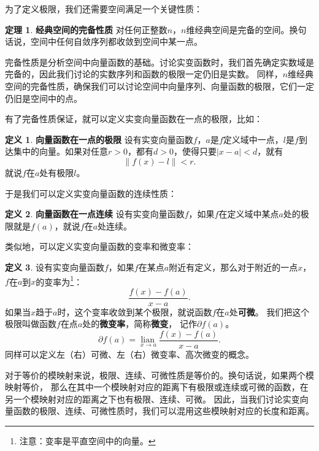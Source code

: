 \documentclass[12pt,UTF8]{ctexbook}
\newcommand{\lian}[1]{
    \underset{#1}{\operatorname{lian}\,}
}
\theoremstyle{definition}
\newtheorem{df}{定义}[section]
\newtheorem{tm}{定理}[section]
\theoremstyle{plain}
\begin{document}
为了定义极限，我们还需要空间满足一个关键性质：
\begin{tm}{\textbf{经典空间的完备性质}}
    对任何正整数$n$，$n$维经典空间是完备的空间。换句话说，空间中任何自敛序列都收敛到空间中某一点。
\end{tm}
完备性质是分析空间中向量函数的基础。讨论实变函数时，我们首先确定实数域是完备的，因此我们讨论的实数序列和函数的极限一定仍旧是实数。
同样，$n$维经典空间的完备性质，确保我们可以讨论空间中向量序列、向量函数的极限，它们一定仍旧是空间中的点。

有了完备性质保证，就可以定义实变向量函数在一点的极限，比如：
\begin{df}{\textbf{向量函数在一点的极限}}
    设有实变向量函数$f$，$a$是$f$定义域中一点，$l$是$f$到达集中的向量。如果对任意$r>0$，都有$d>0$，使得只要$|x - a| < d$，就有
    $$\left\|f(x) - l\right\| < r.$$
    就说$f$在$a$处有极限$l$。
\end{df}

于是我们可以定义实变向量函数的连续性质：
\begin{df}{\textbf{向量函数在一点连续}}
    设有实变向量函数$f$，如果$f$在定义域中某点$a$处的极限就是$f(a)$，就说$f$在$a$处连续。
\end{df}

类似地，可以定义实变向量函数的变率和微变率：
\begin{df}
    设有实变向量函数$f$，如果$f$在某点$a$附近有定义，那么对于附近的一点$x$，$f$在$a$到$x$的变率为\footnote{注意：变率是平直空间中的向量。}：
    $$ \frac{f(x) - f(a)}{x - a}.$$
    如果当$x$趋于$a$时，这个变率收敛到某个极限，就说函数$f$在$a$处\textbf{可微}。
    我们把这个极限叫做函数$f$在点$a$处的\textbf{微变率}，简称\textbf{微变}，
    记作$\partial f(a)$。
    $$ \partial f(a) = \lian{{x\to a}} \frac{f(x) - f(a)}{x - a}. $$
    同样可以定义左（右）可微、左（右）微变率、高次微变的概念。
\end{df}

对于等价的模映射来说，极限、连续、可微性质是等价的。换句话说，如果两个模映射等价，
那么在其中一个模映射对应的距离下有极限或连续或可微的函数，在另一个模映射对应的距离之下也有极限、连续、可微。
因此，当我们讨论实变向量函数的极限、连续、可微性质时，我们可以混用这些模映射对应的长度和距离。
\end{document}
